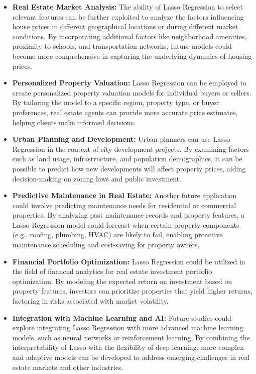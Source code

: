 \documentclass[12pt, a4paper]{report}
\begin{document}
\begin{itemize}
    \item \textbf{Real Estate Market Analysis:} The ability of Lasso Regression to select relevant features can be further exploited to analyze the factors influencing house prices in different geographical locations or during different market conditions. By incorporating additional factors like neighborhood amenities, proximity to schools, and transportation networks, future models could become more comprehensive in capturing the underlying dynamics of housing prices.
    
    \item \textbf{Personalized Property Valuation:} Lasso Regression can be employed to create personalized property valuation models for individual buyers or sellers. By tailoring the model to a specific region, property type, or buyer preferences, real estate agents can provide more accurate price estimates, helping clients make informed decisions.
    
    \item \textbf{Urban Planning and Development:} Urban planners can use Lasso Regression in the context of city development projects. By examining factors such as land usage, infrastructure, and population demographics, it can be possible to predict how new developments will affect property prices, aiding decision-making on zoning laws and public investment.
    
    \item \textbf{Predictive Maintenance in Real Estate:} Another future application could involve predicting maintenance needs for residential or commercial properties. By analyzing past maintenance records and property features, a Lasso Regression model could forecast when certain property components (e.g., roofing, plumbing, HVAC) are likely to fail, enabling proactive maintenance scheduling and cost-saving for property owners.

    \item \textbf{Financial Portfolio Optimization:} Lasso Regression could be utilized in the field of financial analytics for real estate investment portfolio optimization. By modeling the expected return on investment based on property features, investors can prioritize properties that yield higher returns, factoring in risks associated with market volatility.

    \item \textbf{Integration with Machine Learning and AI:} Future studies could explore integrating Lasso Regression with more advanced machine learning models, such as neural networks or reinforcement learning. By combining the interpretability of Lasso with the flexibility of deep learning, more complex and adaptive models can be developed to address emerging challenges in real estate markets and other industries.
\end{itemize}
\end{document}
